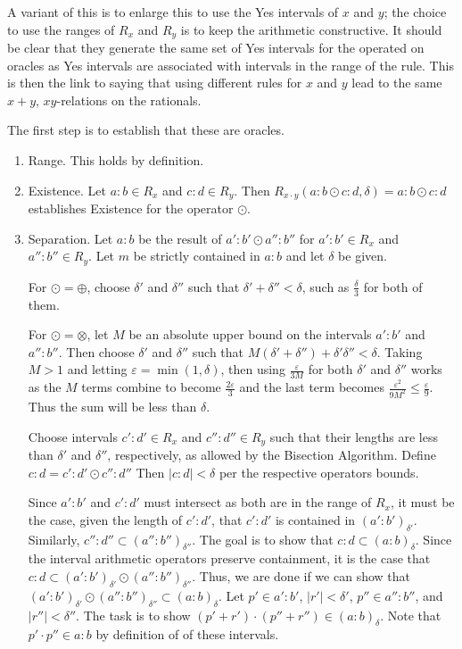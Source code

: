 \documentclass[12pt]{article}
\begin{document}
 A variant of this is to enlarge this to use the Yes intervals of $x$ and $y$; the choice to use the ranges of $R_x$ and $R_y$ is to keep the arithmetic constructive. It should be clear that they generate the same set of Yes intervals for the operated on oracles as Yes intervals are associated with intervals in the range of the rule. This is then the link to saying that using different rules for $x$ and $y$ lead to the same $x+y$, $xy$-relations on the rationals. 

The first step is to establish that these are oracles. 

\begin{enumerate}
    \item Range. This holds by definition. 
    \item Existence. Let $a:b \in R_x$ and $c:d \in R_y$. Then $R_{x\cdot y}(a:b \odot c:d, \delta) = a:b \odot c:d$ establishes Existence for the operator $\odot$. 
    \item Separation. Let $a:b$ be the result of $a':b' \odot a'':b''$ for $a':b' \in R_x$ and $a'': b'' \in R_y$. Let $m$ be strictly contained in $a:b$ and let $\delta$ be given. 
    
    
    For $\odot = \oplus$, choose $\delta'$ and $\delta''$ such that $\delta' + \delta'' < \delta$, such as $\frac{\delta}{3}$ for both of them. 
    
    For $\odot = \otimes$, let $M$ be an absolute upper bound on the intervals $a':b'$ and $a'':b''$. Then choose $\delta'$ and $\delta''$ such that $M (\delta' + \delta'') + \delta' \delta'' < \delta$. Taking $M> 1$ and letting $\varepsilon = \min(1, \delta)$, then using $\frac{\varepsilon}{3M}$ for both $\delta'$ and $\delta''$ works as the $M$ terms combine to become $\frac{2 \varepsilon}{3}$ and the last term becomes $\frac{\varepsilon^2}{9M^2} \leq \frac{\varepsilon}{9}$. Thus the sum will be less than $\delta$.
    
    Choose intervals $c':d' \in R_x$ and $c'':d'' \in R_y$  such that their lengths are less than $\delta'$ and $\delta''$, respectively, as allowed by the Bisection Algorithm. Define $c:d = c':d' \odot c'':d''$ Then $|c:d| < \delta$ per the respective operators bounds. 
    
    Since $a':b'$ and $c':d'$ must intersect as both are in the range of $R_x$, it must be the case, given the length of $c':d'$, that $c':d'$ is contained in $(a':b')_{\delta'}$. Similarly, $c'':d'' \subset (a'':b'')_{\delta''}$. The goal is to show that $c:d \subset (a:b)_\delta$. Since the interval arithmetic operators preserve containment, it is the case that $c:d \subset (a':b')_{\delta'} \odot (a'':b'')_{\delta''}$. Thus, we are done if we can show that  $(a':b')_{\delta'} \odot (a'':b'')_{\delta''} \subset (a:b)_\delta$. Let $p' \in a':b'$, $|r'| < \delta'$, $p'' \in a'':b''$, and $|r''| < \delta''$.  The task is to show $(p'+r') \cdot (p''+ r'') \in (a:b)_\delta$. Note that $p' \cdot p'' \in a:b$ by definition of of these intervals. 


\end{enumerate}
\end{document}
